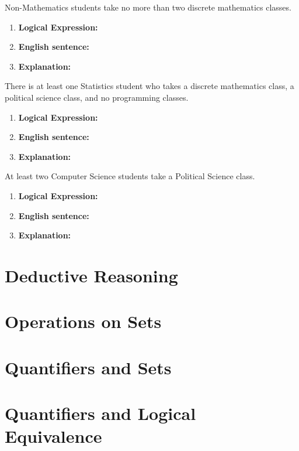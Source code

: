 \documentclass[]{article}
\begin{document}
\begin{question}{2.3}
Non-Mathematics students take no more than two discrete mathematics classes.
\end{question}
\begin{enumerate}[label=(\alph*)]
    \item \textbf{Logical Expression:}
    \item \textbf{English sentence:}
    \item \textbf{Explanation:}
\end{enumerate}

\begin{question}{2.4}
There is at least one Statistics student who takes a discrete mathematics class, a political science class, and no
programming classes.
\end{question}
\begin{enumerate}[label=(\alph*)]
    \item \textbf{Logical Expression:}
    \item \textbf{English sentence:}
    \item \textbf{Explanation:}
\end{enumerate}

\begin{question}{2.5}
At least two Computer Science students take a Political Science class.
\end{question}
\begin{enumerate}[label=(\alph*)]
    \item \textbf{Logical Expression:}
    \item \textbf{English sentence:}
    \item \textbf{Explanation:}
\end{enumerate}

\section{Deductive Reasoning}
\section{Operations on Sets}
\section{Quantifiers and Sets}
\section{Quantifiers and Logical Equivalence}
\end{document}
